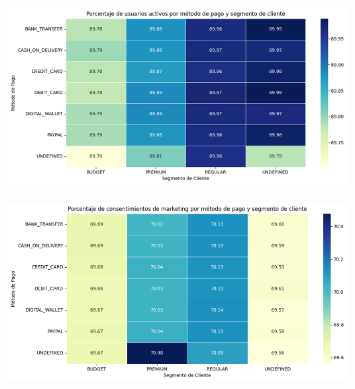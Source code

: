 \begin{figure}[H]
    \centering
    \includegraphics[width=0.8\textwidth]{imagenes/consulta3_heatmap4.png}
\end{figure}

\begin{figure}[H]
    \centering
    \includegraphics[width=0.8\textwidth]{imagenes/consulta3_heatmap5.png}
\end{figure}